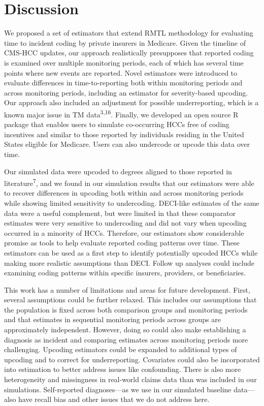 \documentclass[
  12pt,
  number]{elsarticle}
\begin{document}
\section{Discussion}\label{discussion}

We proposed a set of estimators that extend RMTL methodology for
evaluating time to incident coding by private insurers in Medicare.
Given the timeline of CMS-HCC updates, our approach realistically
presupposes that reported coding is examined over multiple monitoring
periods, each of which has several time points where new events are
reported. Novel estimators were introduced to evaluate differences in
time-to-reporting both within monitoring periods and across monitoring
periods, including an estimator for severity-based upcoding. Our
approach also included an adjustment for possible underreporting, which
is a known major issue in TM data\textsuperscript{3,16}. Finally, we
developed an open source R package that enables users to simulate
co-occurring HCCs free of coding incentives and similar to those
reported by individuals residing in the United States eligible for
Medicare. Users can also undercode or upcode this data over time.

Our simulated data were upcoded to degrees aligned to those reported in
literature\textsuperscript{7}, and we found in our simulation results
that our estimators were able to recover differences in upcoding both
within and across monitoring periods while showing limited sensitivity
to undercoding. DECI-like estimates of the same data were a useful
complement, but were limited in that these comparator estimates were
very sensitive to undercoding and did not vary when upcoding occurred in
a minority of HCCs. Therefore, our estimators show considerable promise
as tools to help evaluate reported coding patterns over time. These
estimators can be used as a first step to identify potentially upcoded
HCCs while making more realistic assumptions than DECI. Follow up
analyses could include examining coding patterns within specific
insurers, providers, or beneficiaries.

This work has a number of limitations and areas for future development.
First, several assumptions could be further relaxed. This includes our
assumptions that the population is fixed across both comparison groups
and monitoring periods and that estimates in sequential monitoring
periods across groups are approximately independent. However, doing so
could also make establishing a diagnosis as incident and comparing
estimates across monitoring periods more challenging. Upcoding
estimators could be expanded to additional types of upcoding and to
correct for underreporting. Covariates could also be incorporated into
estimation to better address issues like confounding. There is also more
heterogeneity and missingness in real-world claims data than was
included in our simulations. Self-reported diagnoses---as we use in our
simulated baseline data---also have recall bias and other issues that we
do not address here.
\end{document}
